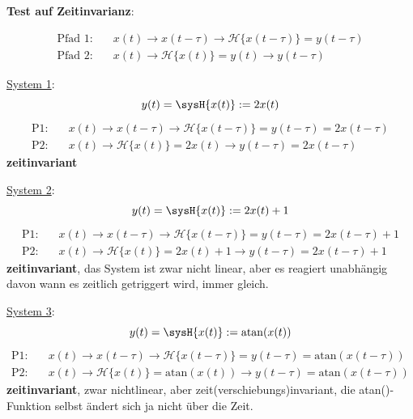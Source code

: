 \begin{Loesung}
\textbf{Test auf Zeitinvarianz}:

\begin{align}
\text{Pfad 1:} \quad &x(t)\rightarrow x(t-\tau)\rightarrow \mathcal{H}\{x(t-\tau)\}=y(t-\tau)\\
\text{Pfad 2:} \quad &x(t)\rightarrow \mathcal{H}\{x(t)\}=y(t)\rightarrow y(t-\tau)
\end{align}

\item  \underline{System 1}:
\begin{equation}
y(t) = \sysH{x(t)}:=2 x(t)
\end{equation}
\begin{align}
\text{P1:}& \quad x(t)\rightarrow x(t-\tau)\rightarrow \mathcal{H}\{x(t-\tau)\}=y(t-\tau)=2 x(t-\tau)\\
\text{P2:}& \quad x(t)\rightarrow \mathcal{H}\{x(t)\}=2 x(t)\rightarrow y(t-\tau)=2 x(t-\tau)
\end{align}
\textbf{zeitinvariant}


\item  \underline{System 2}:
\begin{equation}
y(t) = \sysH{x(t)}:= 2 x(t) + 1
\end{equation}
\begin{align}
\text{P1:}& \quad x(t)\rightarrow x(t-\tau)\rightarrow \mathcal{H}\{x(t-\tau)\}=y(t-\tau)=2 x(t-\tau) + 1\\
\text{P2:}& \quad x(t)\rightarrow \mathcal{H}\{x(t)\}=2 x(t)+1\rightarrow y(t-\tau)=2 x(t-\tau) +1
\end{align}
\textbf{zeitinvariant}, das System ist zwar nicht linear, aber es reagiert
unabhängig davon wann es zeitlich getriggert wird, immer gleich.


\item  \underline{System 3}:
\begin{equation}
y(t) = \sysH{x(t)}:= \mathrm{atan}(x(t))
\end{equation}
\begin{align}
\text{P1:}& \quad x(t)\rightarrow x(t-\tau)\rightarrow \mathcal{H}\{x(t-\tau)\}=y(t-\tau)=\mathrm{atan}(x(t-\tau))\\
\text{P2:}& \quad x(t)\rightarrow \mathcal{H}\{x(t)\}=\mathrm{atan}(x(t))\rightarrow y(t-\tau)=\mathrm{atan}(x(t-\tau))
\end{align}
\textbf{zeitinvariant}, zwar nichtlinear, aber zeit(verschiebungs)invariant, die
atan()-Funktion selbst ändert sich ja nicht über die Zeit.


\end{Loesung}
